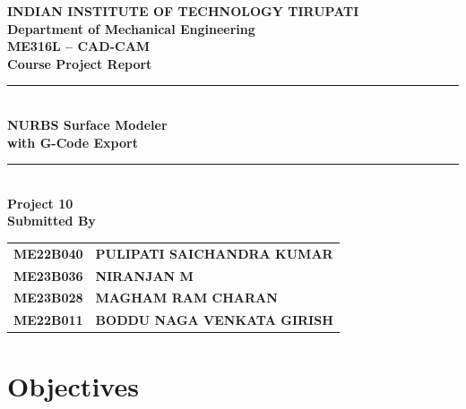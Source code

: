 \documentclass[a4paper,12pt]{article}
\begin{document}
\begin{titlepage}
  \centering
  \vspace*{0.5cm}

  {\large\bfseries INDIAN INSTITUTE OF TECHNOLOGY TIRUPATI}\\[0.4cm]
  {\bfseries Department of Mechanical Engineering}\\[2cm]

  {\large\bfseries ME316L -- CAD-CAM}\\[0.3cm]
  {\Large\bfseries Course Project Report}\\[1.5cm]

  \rule{\textwidth}{1.2pt}\\[0.6cm]
  {\LARGE\bfseries NURBS Surface Modeler}\\[0.3cm]
  {\Large\bfseries with G-Code Export}\\[0.6cm]
  \rule{\textwidth}{1.2pt}\\[2cm]

  {\large\bfseries Project 10}\\[2.5cm]

  {\large\bfseries Submitted By}\\[0.8cm]

  \begin{tabular}{>{\bfseries}l >{\bfseries}l}
    ME22B040 & PULIPATI SAICHANDRA KUMAR       \\[4pt]
    ME23B036 & NIRANJAN M                      \\[4pt]
    ME23B028 & MAGHAM RAM CHARAN               \\[4pt]
    ME22B011 & BODDU NAGA VENKATA GIRISH       \\
  \end{tabular}

  \vfill
\end{titlepage}

\clearpage

\renewcommand{\contentsname}{\Large\bfseries Contents}
\tableofcontents
\clearpage

\section{Objectives}
\end{document}
